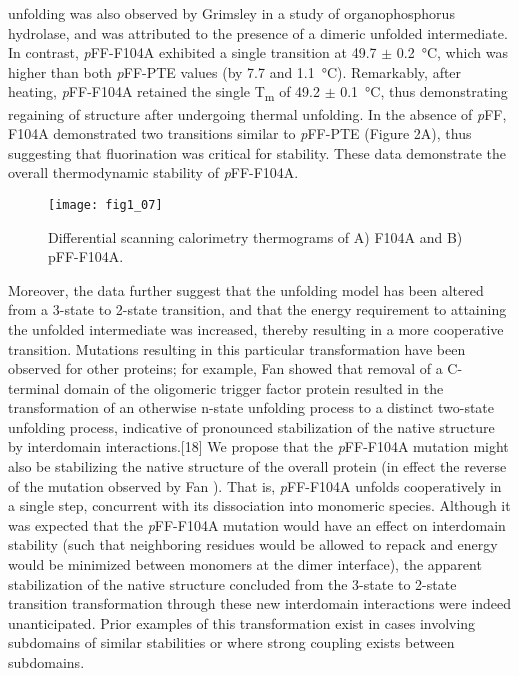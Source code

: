 \begin{refsection}
unfolding was also observed by Grimsley   in a study of
organophosphorus hydrolase, and was attributed to the presence of a dimeric
unfolded intermediate.\cite{Grimsley1997b} In contrast, \emph{p}FF-F104A
exhibited a single transition at 49.7 $\pm$ \SI{0.2}{\celsius}, which was
higher than both \emph{p}FF-PTE values (by 7.7 and \SI{1.1}{\celsius}).
Remarkably, after heating, \emph{p}FF-F104A retained the single
T\textsubscript{m} of 49.2 $\pm$ \SI{0.1}{\celsius}, thus demonstrating
regaining of structure after undergoing thermal unfolding.  In the absence of
\emph{p}FF, F104A demonstrated two transitions similar to \emph{p}FF-PTE
(Figure 2A), thus suggesting that fluorination was critical for stability.
These data demonstrate the overall thermodynamic stability of \emph{p}FF-F104A.
\begin{figure}[h!] \centering \texttt{[image: fig1\_07]}
    \caption[Differential scanning calorimetry thermograms of (A) F104A and (B)
    \emph{p}FF-F104A.]{Differential scanning calorimetry thermograms of A)
    F104A and B) pFF-F104A.} \label{fig:DSC-fig} 
\end{figure}
Moreover, the data further suggest that the unfolding model has been altered
from a 3-state to 2-state transition, and that the energy requirement to
attaining the unfolded intermediate was increased, thereby resulting in a more
cooperative transition. Mutations resulting in this particular transformation
have been observed for other proteins; for example, Fan  showed
that removal of a C-terminal domain of the oligomeric  trigger
factor protein resulted in the transformation of an otherwise n-state unfolding
process to a distinct two-state unfolding process, indicative of pronounced
stabilization of the native structure by interdomain interactions.[18] We
propose that the \emph{p}FF-F104A mutation might also be stabilizing the native
structure of the overall protein (in effect the reverse of the mutation
observed by Fan )\cite{Fan2008}. That is, \emph{p}FF-F104A unfolds
cooperatively in a single step, concurrent with its dissociation into monomeric
species. Although it was expected that the \emph{p}FF-F104A mutation would have an
effect on interdomain stability (such that neighboring residues would be
allowed to repack and energy would be minimized between monomers at the dimer
interface), the apparent stabilization of the native structure concluded from
the 3-state to 2-state transition transformation through these new interdomain
interactions were indeed unanticipated. Prior examples of this transformation
exist in cases involving subdomains of similar stabilities or where strong
coupling exists between subdomains\cite{Tsytlonok2013}.


\end{refsection}
